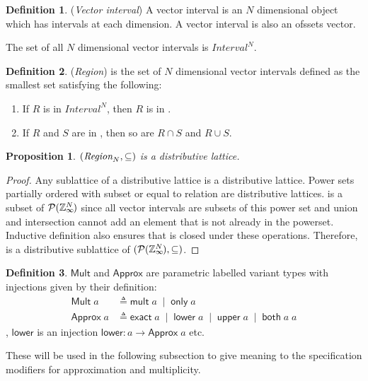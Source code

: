 \documentclass[acmlarge,review]{acmart}
\theoremstyle{definition}
\newtheorem{defn}{Definition}
\theoremstyle{plain}
\newtheorem{prop}{Proposition}
\theoremstyle{remark}
\begin{document}
\begin{defn}{(\emph{Vector interval})}
  A vector interval is an $N$ dimensional object which has \zinf{} intervals at
  each dimension. A vector interval is also an ofssets vector.

  The set of all $N$ dimensional vector intervals is $\textit{Interval}^N$.
\end{defn}

\begin{defn}{(\emph{Region})}
   is the set of $N$ dimensional vector intervals defined as
  the smallest set satisfying the following:
%
  \begin{enumerate}
    \item If $R$ is in $\textit{Interval}^N$, then $R$ is in .
    \item If $R$ and $S$ are in , then so are $R \cap S$ and
      $R \cup S$.
  \end{enumerate}
\end{defn}

\begin{prop}{}
  $(\textnormal{$\textit{Region}_{N}$},\subseteq)$ is a distributive lattice.
\end{prop}
%
\begin{proof}
  Any sublattice of a distributive lattice is a distributive lattice. Power sets
  partially ordered with subset or equal to relation are distributive lattices.
   is a subset of $\mathcal{P}{(\textnormal{$\mathbb{Z}_\infty$}{}^{\mkern-19mu{N}})}$ since all
  vector intervals are subsets of this power set and union and intersection
  cannot add an element that is not already in the powerset.  Inductive
  definition also ensures that  is closed under these operations.
  Therefore,  is a distributive sublattice of
  $(\mathcal{P}{(\textnormal{$\mathbb{Z}_\infty$}{}^{\mkern-19mu{N}})}, \subseteq)$.
\end{proof}

\begin{defn}{}
  $\mathsf{Mult}$ and $\mathsf{Approx}$ are parametric labelled variant types
  with injections given by their definition:
%
  \begin{align*}
    \mathsf{Mult} \; a &
      \triangleq \mathsf{mult} \; a \;\mid\; \mathsf{only} \; a \\
    \mathsf{Approx} \; a &
      \triangleq \mathsf{exact} \; a \;\mid\; \mathsf{lower} \; a \;\mid\;
        \mathsf{upper} \; a \;\mid\; \mathsf{both} \; a \; a
  \end{align*}
%
  \eg{}, $\mathsf{lower}$ is an injection $\mathsf{lower} : a \to \mathsf{Approx}
  \; a$ etc.

  These will be used in the following subsection to give meaning to the
  specification modifiers for approximation and multiplicity.
\end{defn}
\end{document}
